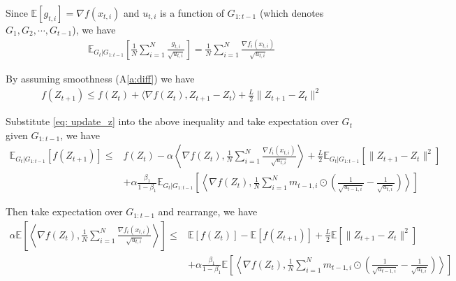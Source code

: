 \documentclass{article} %
\begin{document}
Since $\mathbb E[g_{t,i}] = \nabla f(x_{t,i})$ and $u_{t,i}$ is a function of $G_{1:t-1}$ (which denotes $G_1,G_2,\cdots,G_{t-1}$), we have 
\begin{align}
\mathbb E_{G_t|G_{1:t-1}} \left[\frac{1}{N} \sum_{i=1}^N \frac{g_{t,i}}{\sqrt{u_{t,i}}}\right] =\frac{1}{N} \sum_{i=1}^N \frac{\nabla f_i(x_{t,i})}{\sqrt{u_{t,i}}} 
\end{align}




By assuming smoothness (A\ref{a:diff}) we have 
\begin{align}
f( Z_{t+1}) \leq f( Z_{t}) + \langle \nabla f( Z_{t}),  Z_{t+1}-  Z_{t} \rangle + \frac{L}{2}\| Z_{t+1}-  Z_{t}\|^2 
\end{align}

Substitute \eqref{eq: update_z} into the above inequality and take expectation over $G_{t}$ given $G_{1:t-1}$, we have 
\begin{align}
\mathbb E_{G_t|G_{1:t-1}} [f( Z_{t+1})] \leq & f( Z_{t})  - \alpha  \left \langle \nabla f( Z_{t}), \frac{1}{N} \sum_{i=1}^N \frac{\nabla f_i(x_{t,i})}{\sqrt{u_{t,i}}}  \right \rangle + \frac{L}{2} \mathbb E_{G_t|G_{1:t-1}}\left[\| Z_{t+1}-  Z_{t}\|^2 \right] \nonumber  \\
&+ \alpha \frac{\beta_1}{1-\beta_1}  \mathbb E_{G_t|G_{1:t-1}} \left [\left \langle \nabla f( Z_{t}) , \frac{1}{N} \sum_{i=1}^N m_{t-1	,i} \odot (\frac{1}{\sqrt{u_{t-1,i}}} - \frac{1}{\sqrt{u_{t,i}}}) \right \rangle \right]
\end{align}

Then take expectation over $G_{1:t-1}$ and rearrange, we have 
\begin{align}\label{eq: exp_lip}
\alpha  \mathbb E\left[\left \langle \nabla f( Z_{t}), \frac{1}{N} \sum_{i=1}^N \frac{\nabla f_i(x_{t,i})}{\sqrt{u_{t,i}}}  \right \rangle \right] \leq & \mathbb E  [f( Z_{t})]  -  \mathbb E [f( Z_{t+1})] + \frac{L}{2} \mathbb E\left[\| Z_{t+1}-  Z_{t}\|^2 \right] \nonumber  \\
&+ \alpha \frac{\beta_1}{1-\beta_1}  \mathbb E \left [\left \langle \nabla f( Z_{t}) , \frac{1}{N} \sum_{i=1}^N m_{t-1	,i} \odot (\frac{1}{\sqrt{u_{t-1,i}}} - \frac{1}{\sqrt{u_{t,i}}}) \right \rangle \right]
\end{align}
\end{document}
